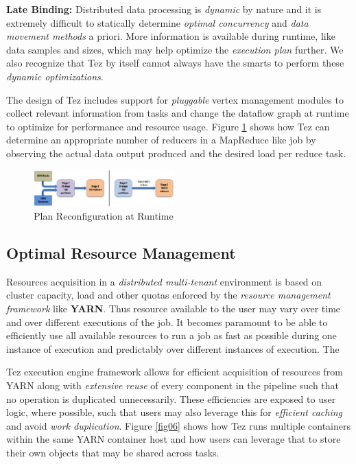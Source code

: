 \documentclass[twocolumn]{article}
\begin{document}
\textbf{Late Binding:} Distributed data processing is \emph{dynamic} by nature and it is
extremely difficult to statically determine \emph{optimal concurrency}
and \emph{data movement methods} a priori. More information is available
during runtime, like data samples and sizes, which may help optimize the
\emph{execution plan} further. We also recognize that Tez by itself
cannot always have the smarts to perform these \emph{dynamic
optimizations}. 

The design of Tez includes support for \textit{pluggable} vertex
management modules to collect relevant information from tasks and change
the dataflow graph at runtime to optimize for performance and resource
usage. Figure \ref{fig05} shows how Tez can determine an appropriate number of
reducers in a MapReduce like job by observing the actual data output
produced and the desired load per reduce task.

\begin{figure}[htb]
        \centering
        \includegraphics[width=0.48\textwidth]{tez3}
        \caption{Plan Reconfiguration at Runtime}
        \label{fig05}
\end{figure}

\subsection{Optimal Resource Management}

Resources acquisition in a \emph{distributed multi-tenant} environment
is based on cluster capacity, load and other quotas enforced by the
\emph{resource management framework} like \textbf{YARN}. Thus resource
available to the user may vary over time and over different executions
of the job. It becomes paramount to be able to efficiently use all
available resources to run a job as fast as possible during one instance
of execution and predictably over different instances of execution. The

Tez execution engine framework allows for efficient acquisition of
resources from YARN along with \emph{extensive reuse} of every component
in the pipeline such that no operation is duplicated unnecessarily.
These efficiencies are exposed to user logic, where possible, such that
users may also leverage this for \emph{efficient caching} and avoid
\emph{work duplication}. Figure \ref{fig06} shows how Tez runs multiple
containers within the same YARN container host and how users can
leverage that to store their own objects that may be shared across
tasks.
\end{document}
